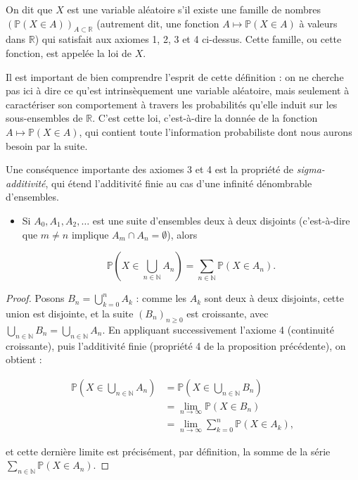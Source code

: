 \medskip

\begin{mdframed}
\begin{definition}
On dit que $X$ est une variable aléatoire s'il existe une famille de nombres $(\mathbb{P}(X \in A))_{A \subset \mathbb{R}}$ (autrement dit, une fonction $A \mapsto \mathbb{P}(X \in A)$ à valeurs dans $\mathbb{R}$) qui satisfait aux axiomes 1, 2, 3 et 4 ci-dessus. Cette famille, ou cette fonction, est appelée la loi de $X$.
\end{definition}
\end{mdframed}

Il est important de bien comprendre l'esprit de cette définition : on ne cherche pas ici à dire ce qu'est intrinsèquement une variable aléatoire, mais seulement à caractériser son comportement à travers les probabilités qu'elle induit sur les sous-ensembles de $\mathbb{R}$. C'est cette loi, c'est-à-dire la donnée de la fonction $A \mapsto \mathbb{P}(X \in A)$, qui contient toute l'information probabiliste dont nous aurons besoin par la suite.

Une conséquence importante des axiomes 3 et 4 est la propriété de \textit{sigma-additivité}, qui étend l'additivité finie au cas d'une infinité dénombrable d'ensembles.

\medskip

\begin{mdframed}
\begin{definition}
\begin{itemize}
\item[$\boxed{4^{\prime \prime}.}$] Si $A_0, A_1, A_2, \dots$ est une suite d'ensembles deux à deux disjoints (c'est-à-dire que $m \neq n$ implique $A_m \cap A_n = \emptyset$), alors

$$
\mathbb{P}\left(X \in \bigcup_{n \in \mathbb{N}} A_n\right) = \sum_{n \in \mathbb{N}} \mathbb{P}(X \in A_n).
$$
\end{itemize}
\end{definition}
\end{mdframed}

\begin{proof} 
Posons $B_n = \bigcup_{k=0}^n A_k$ : comme les $A_k$ sont deux à deux disjoints, cette union est disjointe, et la suite $(B_n)_{n \geq 0}$ est croissante, avec $\bigcup_{n \in \mathbb{N}} B_n = \bigcup_{n \in \mathbb{N}} A_n$. En appliquant successivement l'axiome 4 (continuité croissante), puis l'additivité finie (propriété 4 de la proposition précédente), on obtient :

\begin{align*}
\mathbb{P}\left(X \in \bigcup_{n \in \mathbb{N}} A_n\right) &= \mathbb{P}\left(X \in \bigcup_{n \in \mathbb{N}} B_n\right) \\
&= \lim_{n \to \infty} \mathbb{P}(X \in B_n) \\
&= \lim_{n \to \infty} \sum_{k=0}^n \mathbb{P}(X \in A_k),
\end{align*}

et cette dernière limite est précisément, par définition, la somme de la série $\sum_{n \in \mathbb{N}} \mathbb{P}(X \in A_n)$.
\end{proof}

